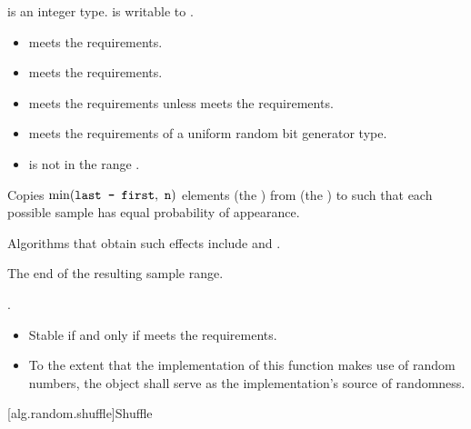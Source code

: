 \begin{itemdescr}
\pnum
\mandates
{} is an integer type.
 is writable to .

\pnum
\expects
\begin{itemize}
\item
   meets
  the  requirements.
\item
   meets
  the  requirements.
\item
   meets
  the  requirements
  unless  meets
  the  requirements.
\item
   meets
  the requirements of a uniform random bit generator type.
\item
   is not in the range .
\end{itemize}

\pnum
\effects
Copies $\min(\tcode{last - first}, \ \tcode{n})$ elements (the )
from  (the ) to 
such that each possible sample has equal probability of appearance.
\begin{note}
Algorithms that obtain such effects include 
and .
\end{note}

\pnum
\returns
The end of the resulting sample range.

\pnum
\complexity
{}.

\pnum
\remarks
\begin{itemize}
\item
  Stable if and only if  meets
  the  requirements.
\item
  To the extent that the implementation of this function makes use
  of random numbers, the object  shall serve as
  the implementation's source of randomness.
\end{itemize}
\end{itemdescr}

[alg.random.shuffle]{Shuffle}

